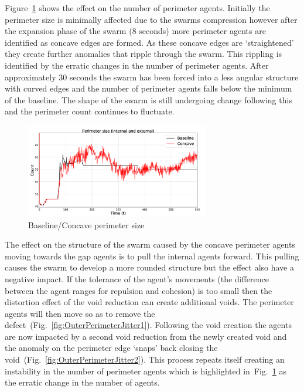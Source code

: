 \documentclass[preprint,12pt]{elsarticle}
\begin{document}
Figure~\ref{concave:BaselineConcavePerimeter} shows the effect on the number of perimeter agents. Initially the perimeter size is minimally affected due to the swarms compression however after the expansion phase of the swarm (8 seconds) more perimeter agents are identified as concave edges are formed. As these concave edges are `straightened' they create further anomalies that ripple through the swarm. This rippling is identified by the erratic changes in the number of perimeter agents. After approximately 30 seconds the swarm has been forced into a less angular structure with curved edges and the number of perimeter agents falls below the minimum of the baseline. The shape of the swarm is still undergoing change following this and the perimeter count continues to fluctuate.
\begin{figure}
\begin{center}
\includegraphics[width=8cm]{figures/BaselineConcavePerimeter}
\end{center}
\caption{Baseline/Concave perimeter size\label{concave:BaselineConcavePerimeter}}
\end{figure}
The effect on the structure of the swarm caused by the concave perimeter agents moving towards the gap agents is to pull the internal agents forward. This pulling causes the swarm to develop a more rounded structure but the effect also have a negative impact. If the tolerance of the agent's movements (the difference between the agent ranges for repulsion and cohesion) is too small then the distortion effect of the void reduction can create additional voids. The perimeter agents will then move so as to remove the defect~(Fig.~\ref{fig:OuterPerimeterJitter1}). Following the void creation the agents are now impacted by a second void reduction from the newly created void and the anomaly on the perimeter edge `snaps' back closing the void~(Fig.~\ref{fig:OuterPerimeterJitter2}). This process repeats itself creating an instability in the number of perimeter agents which is highlighted in~Fig.~\ref{concave:BaselineConcavePerimeter} as the erratic change in the number of agents. 
\end{document}
